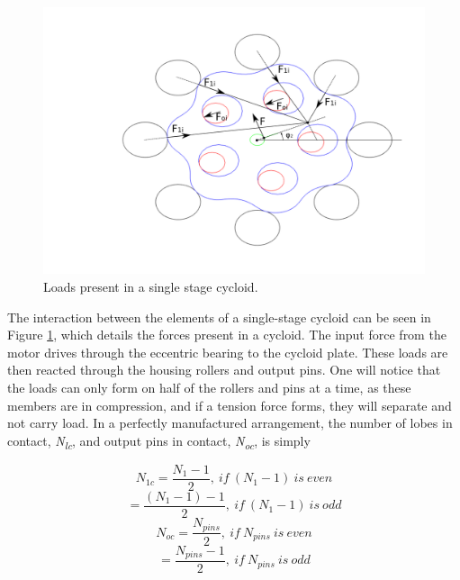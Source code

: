 \begin{figure}[t]
   \centering
   \includegraphics[width=01.0\linewidth]{fig/single_loads}
   \caption{Loads present in a single stage cycloid.}
   \label{fig:single_loads}
\end{figure}

The interaction between the elements of a single-stage cycloid can be seen in Figure \ref{fig:single_loads}, which details the forces present in a cycloid. The input force from the motor drives through the eccentric bearing to the cycloid plate. These loads are then reacted through the housing rollers and output pins. One will notice that the loads can only form on half of the rollers and pins at a time, as these members are in compression, and if a tension force forms, they will separate and not carry load. In a perfectly manufactured arrangement, the number of lobes in contact, \textit{N\textsubscript{lc}}, and output pins in contact, \textit{N\textsubscript{oc}}, is simply 


\begin{equation}
N_{1c} = \frac{N_{1} - 1}{2},\ if\ (N_1 -1)\ is\ even 
\end{equation}
\begin{equation}
= \frac{(N_{1}-1) - 1}{2},\ if\ (N_{1} - 1)\ is\ odd 
\end{equation}
\begin{equation}
N_{oc} = \frac{N_{pins}}{2},\ if\ N_{pins}\ is\ even 
\end{equation}
\begin{equation}
= \frac{N_{pins} - 1}{2},\ if\ N_{pins}\ is\ odd 
\end{equation}


